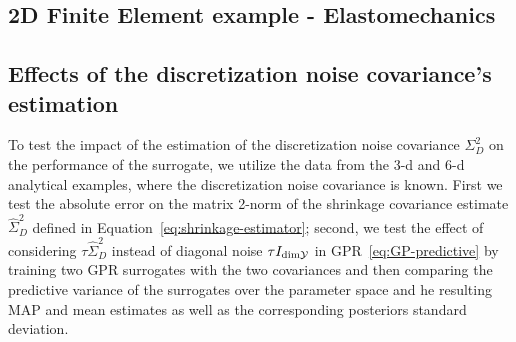 \subsection{2D Finite Element example - Elastomechanics}\label{sec:FEexp}



\subsection{Effects of the discretization noise covariance's estimation}\label{sec:cov-est}

To test the impact of the estimation of the discretization noise covariance $\Sigma_D^2$ on the performance of the surrogate, we utilize the data from the 3-d and 6-d analytical examples, where the discretization noise covariance is known.
First we test the absolute error on the matrix 2-norm of the shrinkage covariance estimate $\hat \Sigma_D^2$ defined in Equation~\eqref{eq:shrinkage-estimator}; second, we test the effect of considering $\tau \hat \Sigma_D^2$ instead of diagonal noise $\tau I_{\text{dim}\mathcal Y}$ in GPR~\eqref{eq:GP-predictive} by training two GPR surrogates with the two covariances and then comparing the predictive variance of the surrogates over the parameter space and he resulting MAP and mean estimates as well as the corresponding posteriors standard deviation.



